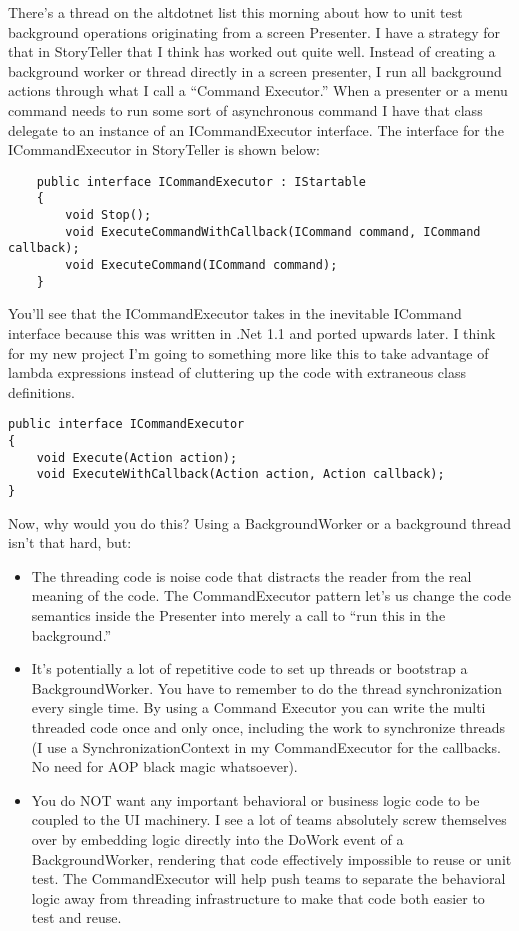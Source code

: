 \documentclass{article}
\begin{document}
{There's a thread on the altdotnet list this morning about how to unit test background operations originating from a screen Presenter.  I have a strategy for that in StoryTeller that I think has worked out quite well.  Instead of creating a background worker or thread directly in a screen presenter, I run all background actions through what I call a “Command Executor.”  When a presenter or a menu command needs to run some sort of asynchronous command I have that class delegate to an instance of an ICommandExecutor interface.  The interface for the ICommandExecutor in StoryTeller is shown below:
\begin{lstlisting}
    public interface ICommandExecutor : IStartable
    {
        void Stop();
        void ExecuteCommandWithCallback(ICommand command, ICommand callback);
        void ExecuteCommand(ICommand command);
    }
\end{lstlisting}
You'll see that the ICommandExecutor takes in the inevitable ICommand interface because this was written in .Net 1.1 and ported upwards later.  I think for my new project I'm going to something more like this to take advantage of lambda expressions instead of cluttering up the code with extraneous class definitions.
\begin{lstlisting}
public interface ICommandExecutor
{
    void Execute(Action action);
    void ExecuteWithCallback(Action action, Action callback);
}
\end{lstlisting}
Now, why would you do this?  Using a BackgroundWorker or a background thread isn't that hard, but:
 \begin{itemize}
    \item  The threading code is noise code that distracts the reader from the real meaning of the code.  The CommandExecutor pattern let's us change the code semantics inside the Presenter into merely a call to “run this in the background.”  
 \item  It's potentially a lot of repetitive code to set up threads or bootstrap a BackgroundWorker.  You have to remember to do the thread synchronization every single time.  By using a Command Executor you can write the multi threaded code once and only once, including the work to synchronize threads (I use a SynchronizationContext in my CommandExecutor for the callbacks.  No need for AOP black magic whatsoever).  
 \item  You do NOT want any important behavioral or business logic code to be coupled to the UI machinery.  I see a lot of teams absolutely screw themselves over by embedding logic directly into the DoWork event of a BackgroundWorker, rendering that code effectively impossible to reuse or unit test.  The CommandExecutor will help push teams to separate the behavioral logic away from threading infrastructure to make that code both easier to test and reuse.  

\end{itemize}}
\end{document}

